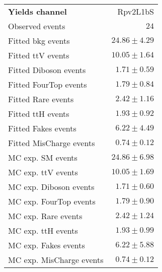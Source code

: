 

\begin{table}
\begin{center}
\setlength{\tabcolsep}{0.0pc}
{\small
\begin{tabular*}{\textwidth}{@{\extracolsep{\fill}}lr}
\noalign{\smallskip}\hline\noalign{\smallskip}
{\bfseries Yields channel}           & Rpv2L1bS              \\[-0.05cm]
\noalign{\smallskip}\hline\noalign{\smallskip}
Observed events          & $24$                    \\
\noalign{\smallskip}\hline\noalign{\smallskip}
Fitted bkg events         & $24.86 \pm 4.29$              \\
\noalign{\smallskip}\hline\noalign{\smallskip}
        Fitted ttV events         & $10.05 \pm 1.64$              \\
        Fitted Diboson events         & $1.71 \pm 0.59$              \\
        Fitted FourTop events         & $1.79 \pm 0.84$              \\
        Fitted Rare events         & $2.42 \pm 1.16$              \\
        Fitted ttH events         & $1.93 \pm 0.92$              \\
        Fitted Fakes events         & $6.22 \pm 4.49$              \\
        Fitted MisCharge events         & $0.74 \pm 0.12$              \\
 \noalign{\smallskip}\hline\noalign{\smallskip}
MC exp. SM events              & $24.86 \pm 6.98$              \\
\noalign{\smallskip}\hline\noalign{\smallskip}
        MC exp. ttV events         & $10.05 \pm 1.69$              \\
        MC exp. Diboson events         & $1.71 \pm 0.60$              \\
        MC exp. FourTop events         & $1.79 \pm 0.90$              \\
        MC exp. Rare events         & $2.42 \pm 1.24$              \\
        MC exp. ttH events         & $1.93 \pm 0.99$              \\
        MC exp. Fakes events         & $6.22 \pm 5.88$              \\
        MC exp. MisCharge events         & $0.74 \pm 0.12$              \\

\end{tabular*}}
\end{center}
\end{table}
